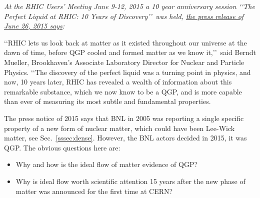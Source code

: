 \noindent \textit{At the RHIC Users' Meeting June 9-12, 2015 a 10 year anniversary session \lq\lq The Perfect Liquid at RHIC: 10 Years of Discovery\rq\rq\ was held, \href{https://www.bnl.gov/newsroom/news.php?a=25756}{the press release of June 26, 2015 says}:}\\[-0.7cm]
%
\begin{mdframed}[linecolor=gray,roundcorner=12pt,backgroundcolor=GreenYellow!15,linewidth=1pt,leftmargin=0cm,rightmargin=0cm,topline=true,bottomline=true,skipabove=12pt]\relax%
%
\lq\lq RHIC lets us look back at matter as it existed throughout our universe at the dawn of time, before QGP cooled and formed matter as we know it,\rq\rq\ said Berndt Mueller, Brookhaven\rq s Associate Laboratory Director for Nuclear and Particle Physics. \lq\lq The discovery of the perfect liquid was a turning point in physics, and now, 10 years later, RHIC has revealed a wealth of information about this remarkable substance, which we now know to be a QGP, and is more capable than ever of measuring its most subtle and fundamental properties.
\end{mdframed}

The press notice of 2015 says that BNL in 2005 was reporting a single specific property of a new form of nuclear matter, which could have been Lee-Wick matter, see Sec.~\ref{sssec:dense}. However, the BNL actors decided in 2015, it was QGP. The obvious questions here are:\\
\begin{itemize}
\item
Why and how is the ideal flow of matter evidence of QGP?
\item
Why is ideal flow worth scientific attention 15 years after the new phase of matter was announced for the first time at CERN?
\end{itemize}

